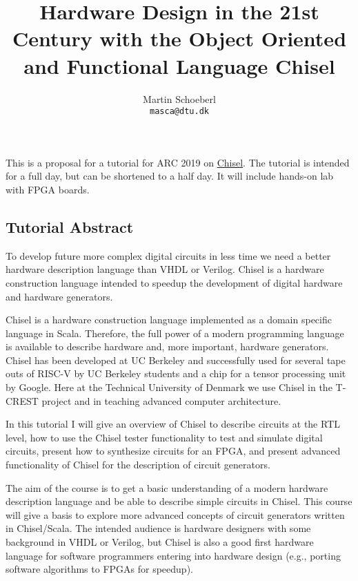 \documentclass{article}
\begin{document}
\title{Hardware Design in the 21st Century with the Object Oriented and Functional Language Chisel}

\author{Martin Schoeberl\\
\texttt{masca@dtu.dk}}


\maketitle \thispagestyle{empty}


This is a proposal for a tutorial for ARC 2019 on \href{https://chisel.eecs.berkeley.edu/}{Chisel}.
The tutorial is intended for a full day, but can be shortened to a half day.
It will include hands-on lab with FPGA boards.

\subsection*{Tutorial Abstract}

To develop future more complex digital circuits in less time we need a better hardware description
language than VHDL or Verilog. Chisel is a hardware construction language intended to
speedup the development of digital hardware and hardware generators.

Chisel is a hardware construction language implemented as a domain specific language in Scala.
Therefore, the full power of a modern programming language is available to describe hardware and,
more important, hardware generators.
Chisel has been developed at UC Berkeley and successfully used for several tape outs of RISC-V
by UC Berkeley students and a chip for a tensor processing unit by Google.
Here at the Technical University of Denmark we use Chisel in the T-CREST project and
in teaching advanced computer architecture.

In this tutorial I will give an overview of Chisel to describe circuits at the RTL level, how to use the Chisel tester functionality to test and simulate digital circuits, present how to synthesize circuits for an FPGA, and present advanced functionality of Chisel for the description of circuit generators.

The aim of the course is to get a basic understanding of a modern hardware description language and be able to describe simple circuits in Chisel. This course will give a basis to explore more advanced concepts of circuit generators written in Chisel/Scala. The intended audience is hardware designers with some background in VHDL or Verilog, but Chisel is also a good first hardware language for software programmers entering into hardware design
(e.g., porting software algorithms to FPGAs for speedup).
\end{document}

